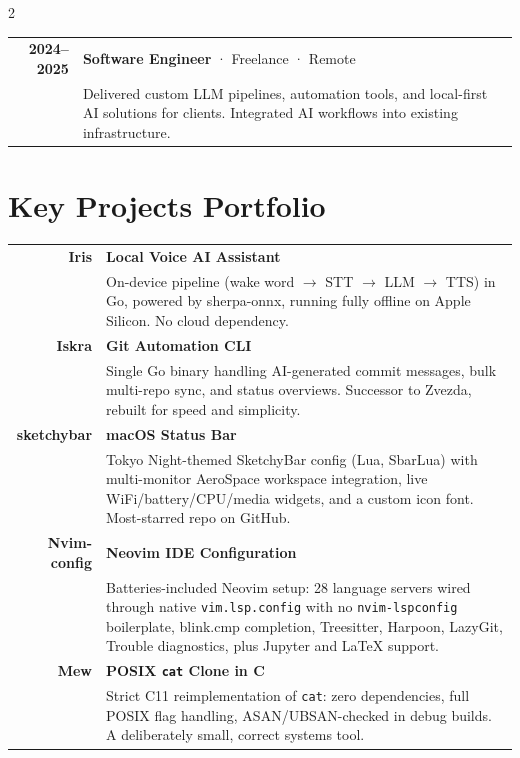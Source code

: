 \documentclass[lighthipster]{simplehipstercv}
\begin{document}
\begin{paracol}{2}
\begin{tabular}{r| p{}}
    \textbf{2024--2025} & \textbf{Software Engineer} · \textcolor{cvgreen}{Freelance} · Remote \\
    & {\footnotesize Delivered custom LLM pipelines, automation tools, and local-first AI solutions for clients. Integrated AI workflows into existing infrastructure.} \\
\end{tabular}

\vspace{1.2em}

\section*{Key Projects Portfolio}

\begin{tabular}{r| p{}}
    \textbf{Iris} & \textbf{Local Voice AI Assistant} \\
    & {\footnotesize On-device pipeline (wake word $\to$ STT $\to$ LLM $\to$ TTS) in Go, powered by sherpa-onnx, running fully offline on Apple Silicon. No cloud dependency.} \\[0.8em]

    \textbf{Iskra} & \textbf{Git Automation CLI} \\
    & {\footnotesize Single Go binary handling AI-generated commit messages, bulk multi-repo sync, and status overviews. Successor to Zvezda, rebuilt for speed and simplicity.} \\[0.8em]

    \textbf{sketchybar} & \textbf{macOS Status Bar} \\
    & {\footnotesize Tokyo Night-themed SketchyBar config (Lua, SbarLua) with multi-monitor AeroSpace workspace integration, live WiFi/battery/CPU/media widgets, and a custom icon font. Most-starred repo on GitHub.} \\[0.8em]

    \textbf{Nvim-config} & \textbf{Neovim IDE Configuration} \\
    & {\footnotesize Batteries-included Neovim setup: 28 language servers wired through native \texttt{vim.lsp.config} with no \texttt{nvim-lspconfig} boilerplate, blink.cmp completion, Treesitter, Harpoon, LazyGit, Trouble diagnostics, plus Jupyter and LaTeX support.} \\[0.8em]

    \textbf{Mew} & \textbf{POSIX \texttt{cat} Clone in C} \\
    & {\footnotesize Strict C11 reimplementation of \texttt{cat}: zero dependencies, full POSIX flag handling, ASAN/UBSAN-checked in debug builds. A deliberately small, correct systems tool.} \\
\end{tabular}


\end{paracol}
\end{document}
